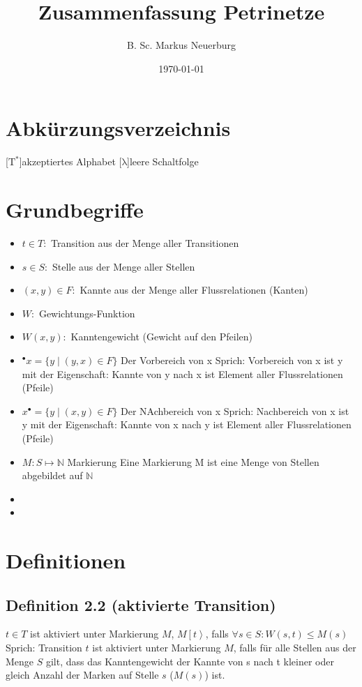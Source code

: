 \documentclass[12pt]{scrreprt}
\title{Zusammenfassung Petrinetze}
\author{B. Sc. Markus Neuerburg}
\date{\today}
\begin{document}
\setlength{\topmargin}{0cm}
\parindent 0pt
\onehalfspacing

\tableofcontents
\newpage
\chapter*{Abkürzungsverzeichnis}
\begin{acronym}[HBCI]
	[$\mathrm{T^*}$]{akzeptiertes Alphabet}
	[$\mathrm{\lambda}$]{leere Schaltfolge}
\end{acronym}

\chapter{Grundbegriffe}
\begin{itemize}
	\item $t \in T:$						\tabto{4cm} Transition aus der Menge aller Transitionen
	\item $s \in S:$						\tabto{4cm} Stelle aus der Menge aller Stellen
	\item $(x, y) \in F:$					\tabto{4cm} Kannte aus der Menge aller Flussrelationen (Kanten)
	\item $W:$								\tabto{4cm} Gewichtungs-Funktion
	\item $W(x, y):$						\tabto{4cm} Kanntengewicht (Gewicht auf den Pfeilen)
	\item $^\bullet x=\{y \mid (y,x) \in F \}$	\tabto{4cm} Der Vorbereich von x\newline
	Sprich: Vorbereich von x ist y mit der Eigenschaft: Kannte von y nach x ist Element aller Flussrelationen (Pfeile)
	\item $x^\bullet =\{y \mid (x, y) \in F\}$	\tabto{4cm} Der NAchbereich von x\newline
	Sprich: Nachbereich von x ist y mit der Eigenschaft: Kannte von x nach y ist Element aller Flussrelationen (Pfeile)
	\item $M:S\mapsto \mathbb{N}$			\tabto{4cm} Markierung\newline
	Eine Markierung M ist eine Menge von Stellen abgebildet auf $\mathbb{N}$
	\item 
	\item 
\end{itemize}

\chapter{Definitionen}
\section{Definition 2.2 (aktivierte Transition)}
$t \in T$ ist aktiviert unter Markierung $M$, $M\left[t\right>$, falls $\forall s \in S:W(s,t) \leq M(s)$\newline
	Sprich: Transition $t$ ist aktiviert unter Markierung $M$, falls für alle Stellen aus der Menge $S$ gilt, dass das Kanntengewicht der Kannte von s nach t kleiner oder gleich Anzahl der Marken auf Stelle $s$ ($M(s)$) ist.
\end{document}
